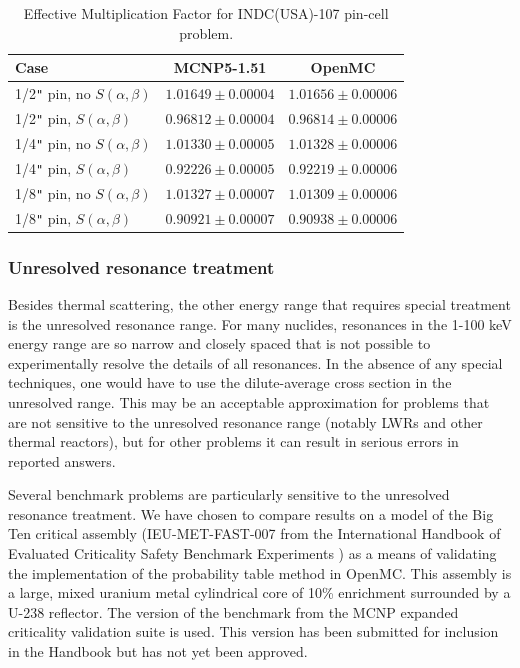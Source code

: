 \documentclass[authoryear,preprint]{elsarticle}
\begin{document}
\begin{table}
  \caption{Effective Multiplication Factor for INDC(USA)-107 pin-cell problem.}
  \label{tab:pincell}
  \begin{center}
  \begin{tabular}{ l c c }
    \hline
    Case & MCNP5-1.51 & OpenMC \\
    \hline
    1/2\verb+"+ pin, no $S(\alpha,\beta)$ & $1.01649 \pm 0.00004$ & $1.01656 \pm 0.00006$ \\
    1/2\verb+"+ pin, $S(\alpha,\beta)$    & $0.96812 \pm 0.00004$ & $0.96814 \pm 0.00006$ \\
    1/4\verb+"+ pin, no $S(\alpha,\beta)$ & $1.01330 \pm 0.00005$ & $1.01328 \pm 0.00006$ \\
    1/4\verb+"+ pin, $S(\alpha,\beta)$    & $0.92226 \pm 0.00005$ & $0.92219 \pm 0.00006$ \\
    1/8\verb+"+ pin, no $S(\alpha,\beta)$ & $1.01327 \pm 0.00007$ & $1.01309 \pm 0.00006$ \\
    1/8\verb+"+ pin, $S(\alpha,\beta)$    & $0.90921 \pm 0.00007$ & $0.90938 \pm 0.00006$ \\
    \hline
  \end{tabular}
  \end{center}
\end{table}

\subsubsection{Unresolved resonance treatment}

Besides thermal scattering, the other energy range that requires special
treatment is the unresolved resonance range. For many nuclides, resonances in
the 1-100 keV energy range are so narrow and closely spaced that is not possible
to experimentally resolve the details of all resonances. In the absence of any
special techniques, one would have to use the dilute-average cross section in
the unresolved range. This may be an acceptable approximation for problems that
are not sensitive to the unresolved resonance range (notably LWRs and other
thermal reactors), but for other problems it can result in serious errors in
reported answers.

Several benchmark problems are particularly sensitive to the unresolved
resonance treatment. We have chosen to compare results on a model of the Big Ten
critical assembly (IEU-MET-FAST-007 from the International Handbook of Evaluated
Criticality Safety Benchmark Experiments \citep{icsbep}) as a means of
validating the implementation of the probability table method in OpenMC. This
assembly is a large, mixed uranium metal cylindrical core of 10\% enrichment
surrounded by a U-238 reflector. The version of the benchmark from the MCNP
expanded criticality validation suite \citep{mcnp-validation} is used. This
version has been submitted for inclusion in the Handbook but has not yet been
approved.
\end{document}
